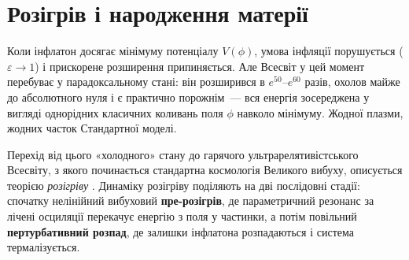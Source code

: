 
\chapter{Розігрів і народження матерії}
\label{sec:reheating}

Коли інфлатон досягає мінімуму потенціалу $V(\phi)$, умова
інфляції порушується ($\varepsilon \to 1$) і прискорене
розширення припиняється. Але Всесвіт у цей момент
перебуває у парадоксальному стані: він розширився в
$e^{50}$--$e^{60}$ разів, охолов майже до абсолютного нуля
і є практично порожнім~--- вся енергія зосереджена у
вигляді однорідних класичних коливань поля $\phi$ навколо
мінімуму. Жодної плазми, жодних часток Стандартної моделі.

Перехід від цього «холодного» стану до гарячого
ультрарелятивістського Всесвіту, з якого починається
стандартна космологія Великого вибуху, описується теорією
\emph{розігріву} \cite{linde_1982, albrecht_1982}. Динаміку
розігріву поділяють на дві послідовні стадії: спочатку
нелінійний вибуховий \textbf{пре-розігрів}, де параметричний
резонанс за лічені осциляції перекачує енергію з поля у
частинки, а потім повільний \textbf{пертурбативний розпад},
де залишки інфлатона розпадаються і система термалізується.

